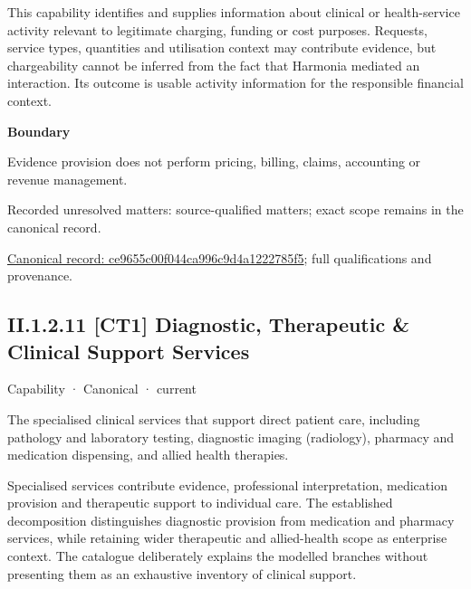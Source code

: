 This capability identifies and supplies information about clinical or health-service activity relevant to legitimate charging, funding or cost purposes. Requests, service types, quantities and utilisation context may contribute evidence, but chargeability cannot be inferred from the fact that Harmonia mediated an interaction. Its outcome is usable activity information for the responsible financial context.



\textbf{Boundary}



Evidence provision does not perform pricing, billing, claims, accounting or revenue management.


{\small Recorded unresolved matters: source-qualified matters; exact scope remains in the canonical record.}\par
{\footnotesize \href{../../../../continuum/strategy/capability/ce9655c00f044ca996c9d4a1222785f5.md}{Canonical record: ce9655c00f044ca996c9d4a1222785f5}; full qualifications and provenance.}\par
\subsection*{II.1.2.11 [CT1] Diagnostic, Therapeutic \& Clinical Support Services}
\label{navigation:II.1.2.11}

\label{element:4d98c3503a9f4890a677f09b0c3b6f82}
{\small Capability · Canonical · current}\par

The specialised clinical services that support direct patient care, including pathology and laboratory testing, diagnostic imaging (radiology), pharmacy and medication dispensing, and allied health therapies.



Specialised services contribute evidence, professional interpretation, medication provision and therapeutic support to individual care. The established decomposition distinguishes diagnostic provision from medication and pharmacy services, while retaining wider therapeutic and allied-health scope as enterprise context. The catalogue deliberately explains the modelled branches without presenting them as an exhaustive inventory of clinical support.



